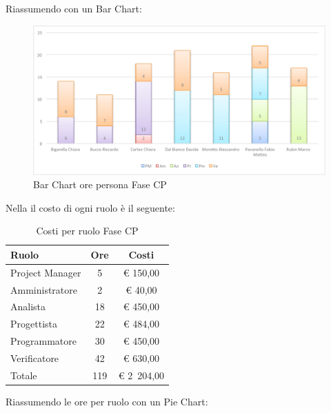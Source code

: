 				Riassumendo con un Bar Chart:
				\begin{figure}[H]\centering
					\includegraphics[width=\textwidth]{PianoDiProgetto/Pics/ChartOreFaseCP.pdf}
					\caption{Bar Chart ore persona Fase CP}
				\end{figure}
				Nella  il costo di ogni ruolo è il seguente:
				\begin{table}[H]
					\begin{center}
						\begin{tabular}{| l | c | c |}
							\hline
							Ruolo 				& Ore 		& Costi  \\ \hline
							
							Project Manager		& 5 		& \euro{} 150,00 	\\
							Amministratore 		& 2 		& \euro{} 40,00 	\\
							Analista	 		& 18 		& \euro{} 450,00 	\\
							Progettista 		& 22 		& \euro{} 484,00  	\\
							Programmatore		& 30 		& \euro{} 450,00 	\\
							Verificatore		& 42 		& \euro{} 630,00 	\\ \hline \hline
							
							Totale	 			& 119 		& \euro{} 2~204,00 	\\ \hline
						\end{tabular}
					\end{center}
					\caption{Costi per ruolo Fase CP}
				\end{table}
				Riassumendo le ore per ruolo con un Pie Chart:
